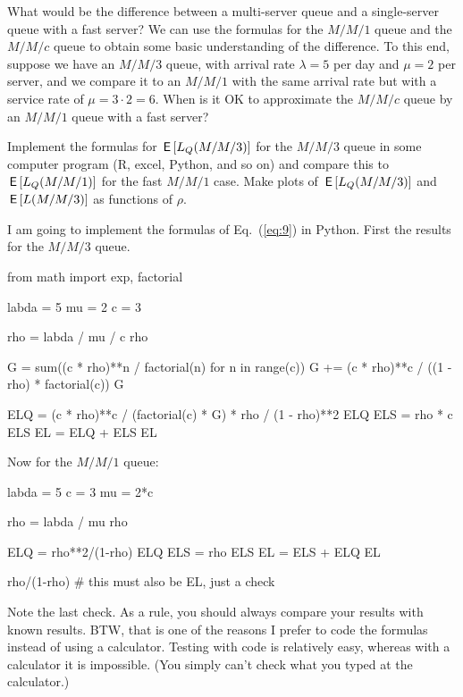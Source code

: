 \begin{exercise}\label{ex:27}
  What would be the difference between a multi-server queue and a
  single-server queue with a fast server? We can use the formulas for
  the $M/M/1$ queue and the $M/M/c$ queue to obtain some basic
  understanding of the difference. To this end, suppose we have an
  $M/M/3$ queue, with arrival rate $\lambda = 5$ per day and $\mu=2$
  per server, and we compare it to an $M/M/1$ with the same arrival
  rate but with a service rate of $\mu = 3\cdot 2 = 6$. 
 When is it OK to approximate the $M/M/c$ queue by an $M/M/1$
    queue with a fast server?
    \begin{hint}
Implement the formulas for $\,\mathsf{E}\left[L_Q(M/M/3)\right]$ for the $M/M/3$ queue in
  some computer program (R, excel, Python, and so on) and compare this
  to $\,\mathsf{E}\left[L_Q(M/M/1)\right]$ for the fast $M/M/1$ case.  Make plots of
  $\,\mathsf{E}\left[L_Q(M/M/3)\right]$ and $\,\mathsf{E}\left[L(M/M/3)\right]$ as functions of $\rho$.
    \end{hint}

  \begin{solution}
I am going to implement the formulas of Eq.~(\ref{eq:9}) in Python. First the results for the $M/M/3$ queue.

\begin{pyconsole}
from math import exp, factorial

labda = 5
mu = 2
c = 3

rho = labda / mu / c
rho

G = sum((c * rho)**n / factorial(n) for n in range(c))
G += (c * rho)**c / ((1 - rho) * factorial(c))
G

ELQ = (c * rho)**c / (factorial(c) * G) * rho / (1 - rho)**2
ELQ
ELS = rho * c
ELS
EL = ELQ + ELS
EL
\end{pyconsole}

Now for the $M/M/1$ queue:

\begin{pyconsole}
labda = 5
c = 3
mu = 2*c

rho = labda / mu 
rho

ELQ = rho**2/(1-rho)
ELQ
ELS = rho
ELS
EL = ELS + ELQ
EL

rho/(1-rho) # this must also be EL, just a check
\end{pyconsole}

Note the last check. As a rule, you should always compare your results
with known results. BTW, that is one of the reasons I prefer to code
the formulas instead of using a calculator. Testing with code is
relatively easy, whereas with a calculator it is impossible. (You
simply can't check what you typed at the calculator.)


\end{solution}
\end{exercise}
